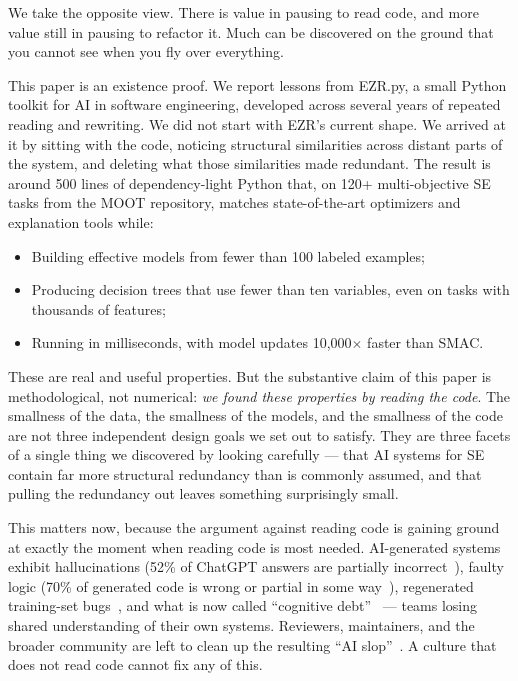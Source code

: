 \documentclass[AMA,STIX2COL]{WileyNJDv5}
\begin{document}
We take the opposite view. There is value in pausing to read code,
and more value still in pausing to refactor it. Much can be
discovered on the ground that you cannot see when you fly over
everything.

This paper is an existence proof. We report lessons from EZR.py,
a small Python toolkit for AI in software engineering, developed
across several years of repeated reading and rewriting. We did
not start with EZR's current shape. We arrived at it by sitting
with the code, noticing structural similarities across distant
parts of the system, and deleting what those similarities made
redundant. The result is around 500 lines of dependency-light
Python that, on 120+ multi-objective SE tasks from the MOOT
repository, matches state-of-the-art optimizers and explanation
tools while:

\begin{itemize}
\item Building effective models from fewer than 100 labeled examples;
\item Producing decision trees that use fewer than ten variables,
even on tasks with thousands of features;
\item Running in milliseconds, with model updates 10{,}000$\times$
faster than SMAC.
\end{itemize}

These are real and useful properties. But the substantive claim
of this paper is methodological, not numerical: \emph{we found
these properties by reading the code}. The smallness of the
data, the smallness of the models, and the smallness of the code
are not three independent design goals we set out to satisfy.
They are three facets of a single thing we discovered by looking
carefully — that AI systems for SE contain far more structural
redundancy than is commonly assumed, and that pulling the
redundancy out leaves something surprisingly small.

This matters now, because the argument against reading code is
gaining ground at exactly the moment when reading code is most
needed. AI-generated systems exhibit hallucinations
(52\% of ChatGPT answers are partially incorrect~\cite{S12}),
faulty logic (70\% of generated code is wrong or partial in
some way~\cite{S15}), regenerated training-set bugs~\cite{S13},
and what is now called ``cognitive debt''~\cite{CognitiveDebt} —
teams losing shared understanding of their own systems.
Reviewers, maintainers, and the broader community are left to
clean up the resulting ``AI slop''~\cite{baltes2026anendlessstreamai}.
A culture that does not read code cannot fix any of this.
\end{document}

